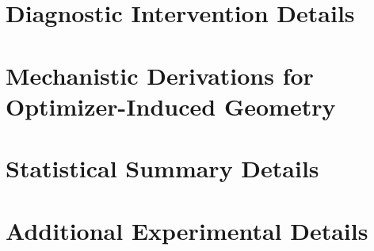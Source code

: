 \documentclass{article} %
\begin{document}
\section{Diagnostic Intervention Details}
\label{app:diagnostic-interventions}


\section{Mechanistic Derivations for Optimizer-Induced Geometry}
\label{app:mechanistic-derivations}


\section{Statistical Summary Details}
\label{app:statistical-summaries}


\section{Additional Experimental Details}
\label{app:experimental-details}

\end{document}
